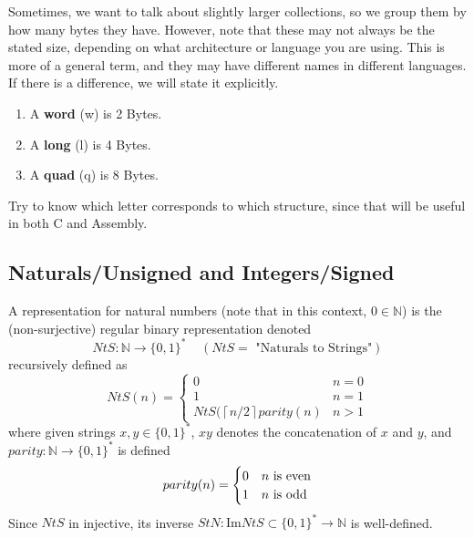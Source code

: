   \begin{definition}
    Sometimes, we want to talk about slightly larger collections, so we group them by how many bytes they have. However, note that these may not always be the stated size, depending on what architecture or language you are using. This is more of a general term, and they may have different names in different languages. If there is a difference, we will state it explicitly. 
    \begin{enumerate}
      \item A \textbf{word} (w) is 2 Bytes. 
      \item A \textbf{long} (l) is 4 Bytes. 
      \item A \textbf{quad} (q) is 8 Bytes. 
    \end{enumerate} 
    Try to know which letter corresponds to which structure, since that will be useful in both C and Assembly. 
  \end{definition}

\subsection{Naturals/Unsigned and Integers/Signed}

  \begin{definition}
    A representation for natural numbers (note that in this context, $0 \in \mathbb{N}$) is the (non-surjective) regular binary representation denoted
    \begin{equation}
      NtS: \mathbb{N} \longrightarrow \{0,1\}^\ast \;\;\;\; (NtS= \text{ "Naturals to Strings"})
    \end{equation}
    recursively defined as 
    \[NtS(n) = \begin{cases}
    0 & n = 0 \\
    1 & n = 1 \\
    NtS(\left \lceil{n/2}\right \rceil parity(n) & n > 1 
    \end{cases}\]
    where given strings $x, y \in \{0,1\}^\ast$, $xy$ denotes the concatenation of $x$ and $y$, and $parity: \mathbb{N} \longrightarrow \{0,1\}^\ast$ is defined 
    \[parity(n) = \begin{cases}
    0 & n $\text{ is even}$ \\
    1 & n $\text{ is odd}$
    \end{cases}\]
    Since $NtS$ in injective, its inverse $StN: \mathrm{Im}{NtS} \subset \{0,1\}^\ast \longrightarrow \mathbb{N}$ is well-defined. 
  \end{definition}

